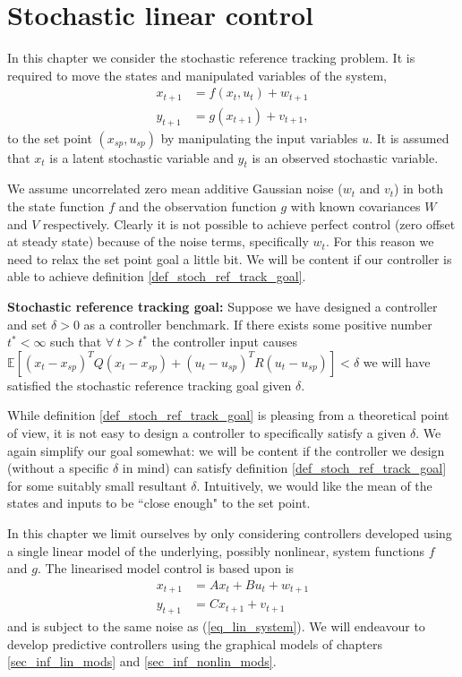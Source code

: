 \chapter{Stochastic linear control}
\label{sec_linear_control}
In this chapter we consider the stochastic reference tracking problem. It is required to move the states and manipulated variables of the system, \begin{equation}
\begin{aligned}
x_{t+1} &= f(x_t, u_t) + w_{t+1}  \\
y_{t+1} &= g(x_{t+1}) + v_{t+1},  
\end{aligned}
\label{eq_lin_system}
\end{equation}
to the set point $(x_{sp}, u_{sp})$ by manipulating the input variables $u$. It is assumed that $x_t$ is a latent stochastic variable and $y_t$ is an observed stochastic variable.

We assume uncorrelated zero mean additive Gaussian noise ($w_t$ and $v_t$) in both the state function $f$ and the observation function $g$ with known covariances $W$ and $V$ respectively. Clearly it is not possible to achieve perfect control (zero offset at steady state) because of the noise terms, specifically $w_t$. For this reason we need to relax the set point goal a little bit. We will be content if our controller is able to achieve definition \ref{def_stoch_ref_track_goal}.
\begin{defn}
\textbf{Stochastic reference tracking goal:} Suppose we have designed a controller and set $\delta > 0$ as a controller benchmark. If there exists some positive number $t^* < \infty$ such that $\forall~t > t^*$ the controller input causes $\mathbb{E}[(x_t-x_{sp})^TQ(x_t-x_{sp}) + (u_t-u_{sp})^TR(u_t-u_{sp})] < \delta$ we will have satisfied the stochastic reference tracking goal given $\delta$.
\label{def_stoch_ref_track_goal}
\end{defn}
While definition \ref{def_stoch_ref_track_goal} is pleasing from a theoretical point of view, it is not easy to design a controller to specifically satisfy a given $\delta$. We again simplify our goal somewhat: we will be content if the controller we design (without a specific $\delta$ in mind) can satisfy definition \ref{def_stoch_ref_track_goal} for some suitably small resultant  $\delta$. Intuitively, we would like the mean of the states and inputs to be ``close enough" to the set point. 

In this chapter we limit ourselves by only considering controllers developed using a single linear model of the underlying, possibly nonlinear, system functions $f$ and $g$. The linearised model control is based upon is
\begin{equation}
\begin{aligned}
x_{t+1} &= Ax_t + Bu_t + w_{t+1} \\
y_{t+1} &= Cx_{t+1} + v_{t+1} 
\end{aligned}
\label{eq_lin_system_control}
\end{equation}
and is subject to the same noise as (\ref{eq_lin_system}). We will endeavour to develop predictive controllers using the graphical models of chapters \ref{sec_inf_lin_mods} and \ref{sec_inf_nonlin_mods}.

